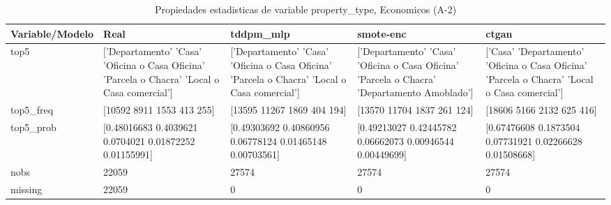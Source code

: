\begin{table}[H]
\centering
\fontsize{8}{14}\selectfont
\caption{Propiedades  estadisticas de variable property\_type, Economicos (A-2)}
\label{table-stats-economicos-a-2-property_type}
\begin{tabular}{|l|m{10em}|m{10em}|m{10em}|m{10em}|}
\hline
 \rowcolor[gray]{0.8}
Variable/Modelo & Real & tddpm\_mlp & smote-enc & ctgan \\
\hline top5 & ['Departamento' 'Casa' 'Oficina o Casa Oficina' 'Parcela o Chacra'
 'Local o Casa comercial'] & ['Departamento' 'Casa' 'Oficina o Casa Oficina' 'Parcela o Chacra'
 'Local o Casa comercial'] & ['Departamento' 'Casa' 'Oficina o Casa Oficina' 'Parcela o Chacra'
 'Departamento Amoblado'] & ['Casa' 'Departamento' 'Oficina o Casa Oficina' 'Parcela o Chacra'
 'Local o Casa comercial'] \\
\hline top5\_freq & [10592  8911  1553   413   255] & [13595 11267  1869   404   194] & [13570 11704  1837   261   124] & [18606  5166  2132   625   416] \\
\hline top5\_prob & [0.48016683 0.4039621  0.0704021  0.01872252 0.01155991] & [0.49303692 0.40860956 0.06778124 0.01465148 0.00703561] & [0.49213027 0.42445782 0.06662073 0.00946544 0.00449699] & [0.67476608 0.1873504  0.07731921 0.02266628 0.01508668] \\
\hline nobs & 22059 & 27574 & 27574 & 27574 \\
\hline missing & 22059 & 0 & 0 & 0 \\
\hline
\end{tabular}
\end{table}
